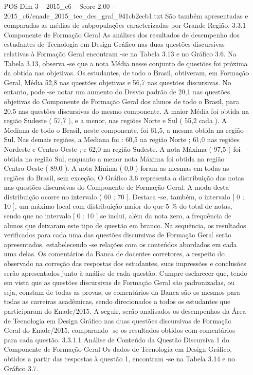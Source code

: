 \begin{textsample}{POS Dim 3 – 2015\_c6 – Score 2.00 – 2015\_c6/enade\_2015\_tec\_des\_graf\_941cb2ecb1.txt}
São também apresentadas e comparadas as médias de subpopulações caracterizadas por Grande Região. 3.3.1 Componente de Formação Geral As análises dos resultados de desempenho dos estudantes de Tecnologia em Design Gráfico nas duas questões discursivas relativas à Formação Geral encontram -se na Tabela 3.13 e no Gráfico 3.6.
Na Tabela 3.13, observa -se que a nota Média nesse conjunto de questões foi próxima da obtida nas objetivas.
Os estudantes, de todo o Brasil, obtiveram, em Formação Geral, Média 52,8 nas questões objetivas e 56,7 nas questões discursivas.
No entanto, pode -se notar um aumento do Desvio padrão de 20,1 nas questões objetivas do Componente de Formação Geral dos alunos de todo o Brasil, para 20,5 nas questões discursivas do mesmo componente.
A maior Média foi obtida na região Sudeste ( 57,7 ), e a menor, nas regiões Norte e Sul ( 55,2 cada ).
A Mediana de todo o Brasil, neste componente, foi 61,5, a mesma obtida na região Sul.
Nas demais regiões, a Mediana foi : 60,5 na região Norte ; 61,0 nas regiões Nordeste e Centro-Oeste ; e 62,0 na região Sudeste.
A nota Máxima ( 97,5 ) foi obtida na região Sul, enquanto a menor nota Máxima foi obtida na região Centro-Oeste ( 89,0 ).
A nota Mínima ( 0,0 ) foram as mesmas em todas as regiões do Brasil, sem exceção.
O Gráfico 3.6 representa a distribuição das notas nas questões discursivas do Componente de Formação Geral.
A moda desta distribuição ocorre no intervalo ( 60 ; 70 ].
Destaca -se, também, o intervalo [ 0 ; 10 ], um máximo local com distribuição maior do que 5 \% do total de notas, sendo que no intervalo [ 0 ; 10 ] se inclui, além da nota zero, a frequência de alunos que deixaram este tipo de questão em branco.
Na sequência, os resultados verificados para cada uma das questões discursivas de Formação Geral serão apresentados, estabelecendo -se relações com os conteúdos abordados em cada uma delas.
Os comentários da Banca de docentes corretores, a respeito do observado na correção das respostas dos estudantes, suas impressões e conclusões serão apresentados junto à análise de cada questão.
Cumpre esclarecer que, tendo em vista que as questões discursivas de Formação Geral são padronizadas, ou seja, constam de todas as provas, os comentários da Banca são os mesmos para todas as carreiras acadêmicas, sendo direcionados a todos os estudantes que participaram do Enade/2015.
A seguir, serão analisados os desempenhos da Área de Tecnologia em Design Gráfico nas duas questões discursivas de Formação Geral do Enade/2015, comparando -se os resultados obtidos com comentários para cada questão. 3.3.1.1 Análise de Conteúdo da Questão Discursiva 1 do Componente de Formação Geral Os dados de Tecnologia em Design Gráfico, obtidos a partir das respostas à questão 1, encontram -se na Tabela 3.14 e no Gráfico 3.7.

\end{textsample}
